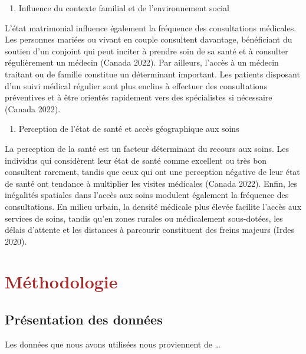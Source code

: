 \documentclass[
]{article}
\providecommand{\tightlist}{%
  \setlength{\itemsep}{0pt}\setlength{\parskip}{0pt}}
\begin{document}
\begin{enumerate}
\def\labelenumi{\arabic{enumi}.}
\setcounter{enumi}{2}
\tightlist
\item
  Influence du contexte familial et de l'environnement social
\end{enumerate}

L'état matrimonial influence également la fréquence des consultations
médicales. Les personnes mariées ou vivant en couple consultent
davantage, bénéficiant du soutien d'un conjoint qui peut inciter à
prendre soin de sa santé et à consulter régulièrement un médecin (Canada
2022). Par ailleurs, l'accès à un médecin traitant ou de famille
constitue un déterminant important. Les patients disposant d'un suivi
médical régulier sont plus enclins à effectuer des consultations
préventives et à être orientés rapidement vers des spécialistes si
nécessaire (Canada 2022).

\begin{enumerate}
\def\labelenumi{\arabic{enumi}.}
\setcounter{enumi}{3}
\tightlist
\item
  Perception de l'état de santé et accès géographique aux soins
\end{enumerate}

La perception de la santé est un facteur déterminant du recours aux
soins. Les individus qui considèrent leur état de santé comme excellent
ou très bon consultent rarement, tandis que ceux qui ont une perception
négative de leur état de santé ont tendance à multiplier les visites
médicales (Canada 2022). Enfin, les inégalités spatiales dans l'accès
aux soins modulent également la fréquence des consultations. En milieu
urbain, la densité médicale plus élevée facilite l'accès aux services de
soins, tandis qu'en zones rurales ou médicalement sous-dotées, les
délais d'attente et les distances à parcourir constituent des freins
majeurs (Irdes 2020).

\newpage

\section{\texorpdfstring{\textcolor{brown} {Méthodologie}}{}}\label{section-2}

\subsection{Présentation des
données}\label{pruxe9sentation-des-donnuxe9es}

Les données que nous avons utilisées nous proviennent de \ldots{}
\end{document}
